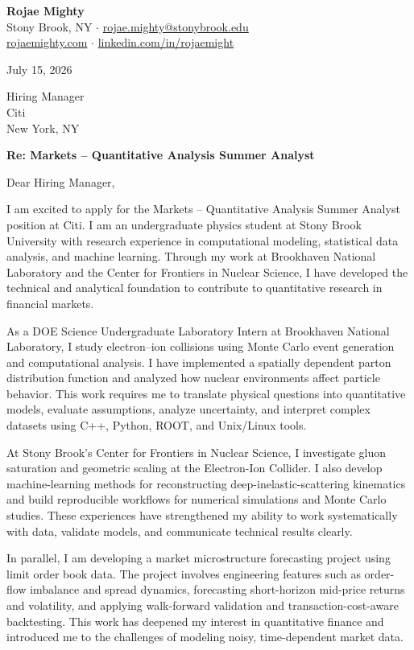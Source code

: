 \documentclass[10pt,letterpaper]{article}
\begin{document}
\textbf{Rojae Mighty}\\
Stony Brook, NY \quad$\cdot$\quad
\href{mailto:rojae.mighty@stonybrook.edu}{rojae.mighty@stonybrook.edu}\\
\href{https://rojaemighty.com}{rojaemighty.com} \quad$\cdot$\quad
\href{https://www.linkedin.com/in/rojaemight/}{linkedin.com/in/rojaemight}

\vspace{8pt}
July 15, 2026

\vspace{8pt}
Hiring Manager\\
Citi\\
New York, NY

\vspace{8pt}
\textbf{Re: Markets -- Quantitative Analysis Summer Analyst}

\vspace{4pt}
Dear Hiring Manager,

I am excited to apply for the Markets -- Quantitative Analysis Summer Analyst position at Citi. I am an undergraduate physics student at Stony Brook University with research experience in computational modeling, statistical data analysis, and machine learning. Through my work at Brookhaven National Laboratory and the Center for Frontiers in Nuclear Science, I have developed the technical and analytical foundation to contribute to quantitative research in financial markets.

As a DOE Science Undergraduate Laboratory Intern at Brookhaven National Laboratory, I study electron--ion collisions using Monte Carlo event generation and computational analysis. I have implemented a spatially dependent parton distribution function and analyzed how nuclear environments affect particle behavior. This work requires me to translate physical questions into quantitative models, evaluate assumptions, analyze uncertainty, and interpret complex datasets using C++, Python, ROOT, and Unix/Linux tools.

At Stony Brook's Center for Frontiers in Nuclear Science, I investigate gluon saturation and geometric scaling at the Electron-Ion Collider. I also develop machine-learning methods for reconstructing deep-inelastic-scattering kinematics and build reproducible workflows for numerical simulations and Monte Carlo studies. These experiences have strengthened my ability to work systematically with data, validate models, and communicate technical results clearly.

In parallel, I am developing a market microstructure forecasting project using limit order book data. The project involves engineering features such as order-flow imbalance and spread dynamics, forecasting short-horizon mid-price returns and volatility, and applying walk-forward validation and transaction-cost-aware backtesting. This work has deepened my interest in quantitative finance and introduced me to the challenges of modeling noisy, time-dependent market data.
\end{document}
